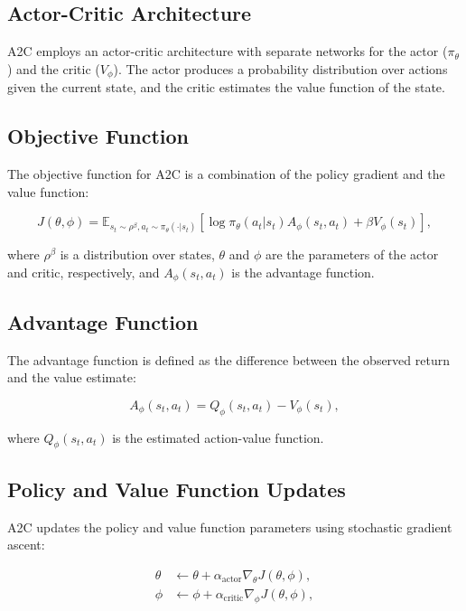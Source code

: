 \documentclass[conference]{IEEEtran}
\begin{document}
\subsection{Actor-Critic Architecture}

A2C employs an actor-critic architecture with separate networks for the actor ($\pi_{\theta}$) and the critic ($V_{\phi}$). The actor produces a probability distribution over actions given the current state, and the critic estimates the value function of the state.

\subsection{Objective Function}

The objective function for A2C is a combination of the policy gradient and the value function:

\begin{equation}
J(\theta, \phi) = \mathbb{E}_{s_t \sim \rho^{\beta}, a_t \sim \pi_{\theta}(\cdot|s_t)} \left[ \log \pi_{\theta}(a_t|s_t) A_{\phi}(s_t, a_t) + \beta V_{\phi}(s_t) \right],
\end{equation}

where $\rho^{\beta}$ is a distribution over states, $\theta$ and $\phi$ are the parameters of the actor and critic, respectively, and $A_{\phi}(s_t, a_t)$ is the advantage function.

\subsection{Advantage Function}

The advantage function is defined as the difference between the observed return and the value estimate:

\begin{equation}
A_{\phi}(s_t, a_t) = Q_{\phi}(s_t, a_t) - V_{\phi}(s_t),
\end{equation}

where $Q_{\phi}(s_t, a_t)$ is the estimated action-value function.

\subsection{Policy and Value Function Updates}

A2C updates the policy and value function parameters using stochastic gradient ascent:

\begin{equation}
\begin{split}
\theta &\leftarrow \theta + \alpha_{\text{actor}} \nabla_{\theta} J(\theta, \phi), \\
\phi &\leftarrow \phi + \alpha_{\text{critic}} \nabla_{\phi} J(\theta, \phi),
\end{split}
\end{equation}
\end{document}
